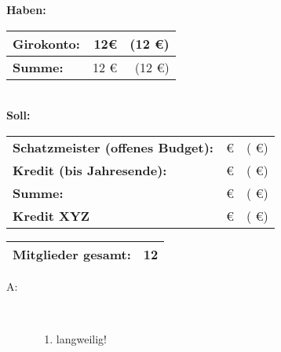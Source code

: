 \begin{Protokoll}
        \begin{center}
            \textbf{Haben:} \\
            \begin{tabular}{|l||r|r|}
                \hline
                \textbf{Girokonto:}            & 12\euro         & (12   \euro)     \\
                \hline
                \textbf{Summe:}                &  12   \euro     & (12 \euro)        \\
                \hline \hline
            \end{tabular} \\
            \vspace{.5em}
            \textbf{Soll:} \\
            \begin{tabular}{|l||r|r|}
                \hline
                 \textbf{Schatzmeister (offenes Budget):}
                &       \euro            & ( \euro)         \\ 
                \textbf{Kredit (bis Jahresende):}    
                &    \euro             & ( \euro)         \\
                \hline
                \textbf{Summe:}                &     \euro         & ( \euro)        \\
                \hline \hline
                \textbf{Kredit XYZ}            &      \euro        & ( \euro) \\
                \hline
            \end{tabular}
        \end{center}
    
        \begin{center}
            \begin{tabular}{|l||r|}
                \hline
                \textbf{Mitglieder gesamt:}             &  12 \\
                \hline
                \hline
            \end{tabular}
        \end{center}
    
        \begin{description}
            \item[A:] \								%
            	\begin{enumerate}
            		\item langweilig!
            	

\end{enumerate}
\end{description}
\end{Protokoll}
